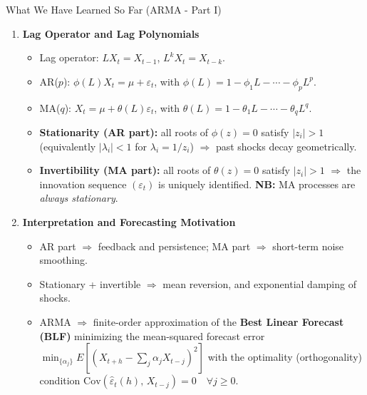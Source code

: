 \documentclass{beamer}
\begin{document}
\begin{frame}{What We Have Learned So Far (ARMA - Part I)}
\begin{enumerate}
    \pause
\item \textbf{Lag Operator and Lag Polynomials}
  \begin{itemize}
  \scriptsize
    \item Lag operator: $L X_t = X_{t-1}$, $L^k X_t = X_{t-k}$.
    \item AR($p$): $\phi(L)X_t = \mu + \varepsilon_t$, with $\phi(L) = 1-\phi_1L-\cdots-\phi_pL^p$.
    \item MA($q$): $X_t = \mu + \theta(L)\varepsilon_t$, with $\theta(L) = 1-\theta_1L-\cdots-\theta_qL^q$.
    \item \textbf{Stationarity (AR part):} all roots of $\phi(z)=0$ satisfy $|z_i|>1$ (equivalently $|\lambda_i|<1$ for $\lambda_i = 1/z_i$) $\Rightarrow$ past shocks decay geometrically.
    \item \textbf{Invertibility (MA part):} all roots of $\theta(z)=0$ satisfy $|z_i|>1$ $\Rightarrow$ the innovation sequence $(\varepsilon_t)$ is uniquely identified. \textbf{NB:} MA processes are \emph{always stationary}.
  \end{itemize}
    \pause
\item \textbf{Interpretation and Forecasting Motivation}
  \begin{itemize}
  \scriptsize
    \item AR part $\Rightarrow$ feedback and persistence; MA part $\Rightarrow$ short-term noise smoothing.
    \item Stationary + invertible $\Rightarrow$ mean reversion, and exponential damping of shocks.
    \item ARMA $\Rightarrow$ finite-order approximation of the \textbf{Best Linear Forecast (BLF)} minimizing the mean-squared forecast error $ \min_{\{\alpha_j\}} E[(X_{t+h} - \sum_j \alpha_j X_{t-j})^2]$  with the optimality (orthogonality) condition $\text{Cov}(\widehat{\varepsilon}_t(h),\, X_{t-j}) = 0 \quad \forall j \ge 0.$
  \end{itemize}
\end{enumerate}
\end{frame}


\end{document}
